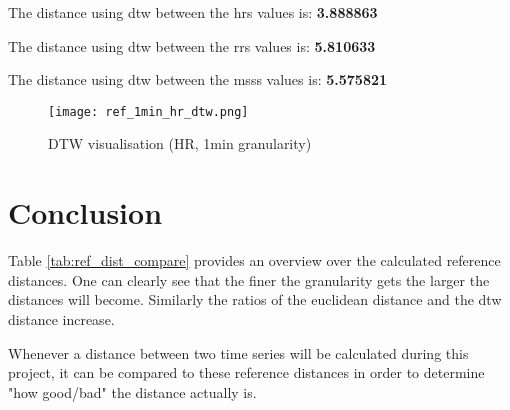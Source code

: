 The distance using \ac{dtw} between the \acp{hr} values is: \textbf{3.888863}


The distance using \ac{dtw} between the \acp{rr} values is: \textbf{5.810633}


The distance using \ac{dtw} between the \acp{mss} values is: \textbf{5.575821}


\begin{figure}[h!]
	\texttt{[image: ref\_1min\_hr\_dtw.png]}
	\caption{DTW visualisation (HR, 1min granularity)}
	\label{fig:ref_dtw_dist_1_min_granularity}
\end{figure}


\clearpage
\section{Conclusion}

Table \ref{tab:ref_dist_compare} provides an overview over the calculated reference distances. One can clearly see that the finer the granularity gets the larger the distances will become. Similarly the ratios of the euclidean distance and the \ac{dtw} distance increase.

\begin{table}[h!]
\centering
{}
\caption{Reference Distances Comperation}
\label{tab:ref_dist_compare}
\end{table}

Whenever a distance between two time series will be calculated during this project, it can be compared to these reference distances in order to determine "how good/bad" the distance actually is.





